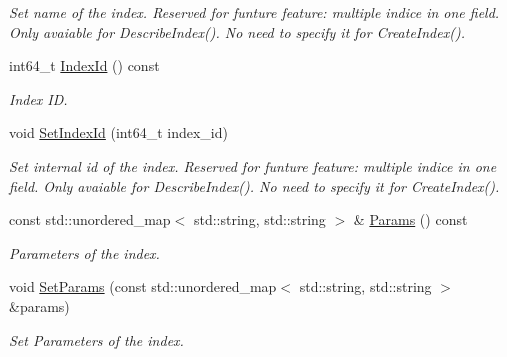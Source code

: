 \begin{DoxyCompactItemize}
\begin{DoxyCompactList}\small\item\em Set name of the index. Reserved for funture feature\+: multiple indice in one field. ~\newline
Only avaiable for Describe\+Index(). No need to specify it for Create\+Index(). \end{DoxyCompactList}\item 
\mbox{\label{classmilvus_1_1_index_desc_acdbcda54adc38c1de7e017377e936412}} 
int64\+\_\+t \hyperlink{classmilvus_1_1_index_desc_acdbcda54adc38c1de7e017377e936412}{Index\+Id} () const
\begin{DoxyCompactList}\small\item\em Index ID. \end{DoxyCompactList}\item 
\mbox{\label{classmilvus_1_1_index_desc_a694d72afa6b8fe664cf1b04cc71a334d}} 
void \hyperlink{classmilvus_1_1_index_desc_a694d72afa6b8fe664cf1b04cc71a334d}{Set\+Index\+Id} (int64\+\_\+t index\+\_\+id)
\begin{DoxyCompactList}\small\item\em Set internal id of the index. Reserved for funture feature\+: multiple indice in one field. Only avaiable for Describe\+Index(). No need to specify it for Create\+Index(). \end{DoxyCompactList}\item 
\mbox{\label{classmilvus_1_1_index_desc_a4ff4cdb9509840589ba3373f1502b12f}} 
const std\+::unordered\+\_\+map$<$ std\+::string, std\+::string $>$ \& \hyperlink{classmilvus_1_1_index_desc_a4ff4cdb9509840589ba3373f1502b12f}{Params} () const
\begin{DoxyCompactList}\small\item\em Parameters of the index. \end{DoxyCompactList}\item 
\mbox{\label{classmilvus_1_1_index_desc_af04f5778f35b9fb45f5c3b1d43221ce1}} 
void \hyperlink{classmilvus_1_1_index_desc_af04f5778f35b9fb45f5c3b1d43221ce1}{Set\+Params} (const std\+::unordered\+\_\+map$<$ std\+::string, std\+::string $>$ \&params)
\begin{DoxyCompactList}\small\item\em Set Parameters of the index. \end{DoxyCompactList}\end{DoxyCompactItemize}


